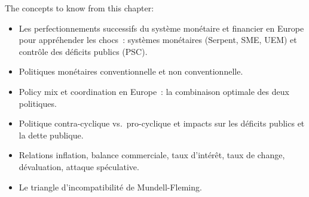\begin{remark}
  The concepts to know from this chapter:
  \begin{itemize}
    \item Les perfectionnements successifs du système monétaire et financier en Europe
      pour appréhender les chocs~: systèmes monétaires (Serpent, SME, UEM) et contrôle
      des déficits publics (PSC).
    \item Politiques monétaires conventionnelle et non conventionnelle.
    \item Policy mix et coordination en Europe~: la combinaison optimale des deux
      politiques.
    \item Politique contra-cyclique vs.\ pro-cyclique et impacts sur les déficits publics
      et la dette publique.
    \item Relations inflation, balance commerciale, taux d'intérêt, taux de change,
      dévaluation, attaque spéculative.
    \item Le triangle d'incompatibilité de Mundell-Fleming.
  \end{itemize}
\end{remark}
